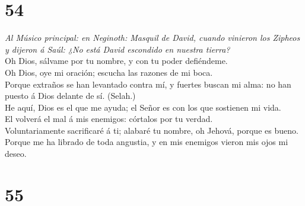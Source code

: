 \hypertarget{section-53}{%
\section{54}\label{section-53}}

 \emph{Al Músico principal: en Neginoth: Masquil de David,
cuando vinieron los Zipheos y dijeron á Saúl: ¿No está David escondido
en nuestra tierra?}\\
Oh Dios, sálvame por tu nombre, y con tu poder defiéndeme.\\
 Oh Dios, oye mi oración; escucha las razones de mi boca.\\
 Porque extraños se han levantado contra mí, y fuertes
buscan mi alma: no han puesto á Dios delante de sí. (Selah.)\\
 He aquí, Dios es el que me ayuda; el Señor es con los que
sostienen mi vida.\\
 El volverá el mal á mis enemigos: córtalos por tu verdad.\\
 Voluntariamente sacrificaré á ti; alabaré tu nombre, oh
Jehová, porque es bueno.\\
 Porque me ha librado de toda angustia, y en mis enemigos
vieron mis ojos mi deseo.

\hypertarget{section-54}{%
\section{55}\label{section-54}}

